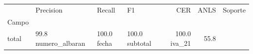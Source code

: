 \begin{tabular}{llllrrr}
\toprule
 & Precision & Recall & F1 & CER & ANLS & Soporte \\
Campo &  &  &  &  &  &  \\
\midrule
total & 99.8%
numero_albaran & 100.0%
fecha & 100.0%
subtotal & 100.0%
iva_21 & 55.8%
\bottomrule
\end{tabular}
